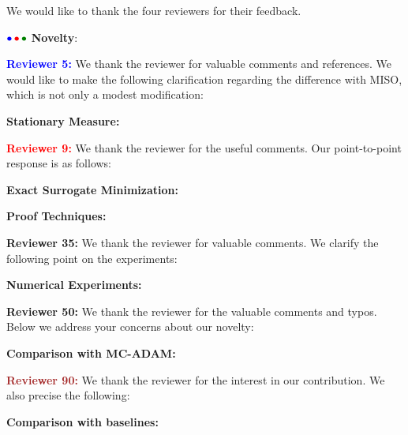 \documentclass{article}
\begin{document}
We would like to thank the four reviewers for their feedback. 

${\color{blue}\bullet}\!~{\color{red}\bullet}\!~{\color{green!50!black}\bullet}$ \textbf{Novelty}: 


\textbf{\textcolor{blue}{Reviewer 5:}} We thank the reviewer for valuable comments and references. We would like to make the following clarification regarding the difference with MISO, which is not only a modest modification: 

\textbf{Stationary Measure:} 

\textbf{\textcolor{red}{Reviewer 9:}} We thank the reviewer for the useful comments. Our point-to-point response is as follows: 

\textbf{Exact Surrogate Minimization:} 

\textbf{Proof Techniques:} 


\textbf{\textcolor{yellow!50!black}{Reviewer 35:}} We thank the reviewer for valuable comments. We clarify the following point on the experiments: 

\textbf{Numerical Experiments:} 





\textbf{\textcolor{green!50!black}{Reviewer 50:}} We thank the reviewer for the valuable comments and typos. Below we address your concerns about our novelty: 

\textbf{Comparison with MC-ADAM:} 


\textbf{\textcolor{brown}{Reviewer 90:}} We thank the reviewer for the interest in our contribution. We also precise the following: 

\textbf{Comparison with baselines:} 
\end{document}
